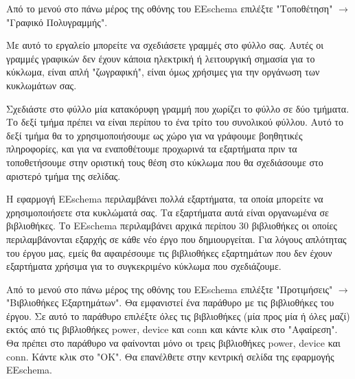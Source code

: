 \documentclass[a4paper]{article}
\begin{document}
\begin{figure}
  \begin{center}
    \label{fig:kicad-main}
  \end{center}
\end{figure}

Από το μενού στο πάνω μέρος της οθόνης του \textenglish{EEschema} επιλέξτε "Τοποθέτηση" $\rightarrow$ "Γραφικό Πολυγραμμής".

Με αυτό το εργαλείο μπορείτε να σχεδιάσετε γραμμές στο φύλλο σας. Αυτές οι γραμμές γραφικών δεν έχουν κάποια ηλεκτρική ή λειτουργική σημασία για το κύκλωμα, είναι απλή "ζωγραφική", είναι όμως χρήσιμες για την οργάνωση των κυκλωμάτων σας.

Σχεδιάστε στο φύλλο μία κατακόρυφη γραμμή που χωρίζει το φύλλο σε δύο τμήματα. Το δεξί τμήμα πρέπει να είναι περίπου το ένα τρίτο του συνολικού φύλλου. Αυτό το δεξί τμήμα θα το χρησιμοποιήσουμε ως χώρο για να γράφουμε  βοηθητικές πληροφορίες, και για να εναποθέτουμε προχωρινά τα εξαρτήματα πριν τα τοποθετήσουμε στην οριστική τους θέση στο κύκλωμα που θα σχεδιάσουμε στο αριστερό τμήμα της σελίδας.

\begin{figure}
  \begin{center}
    \label{fig:kicad-main}
  \end{center}
\end{figure}

Η εφαρμογή \textenglish{EEschema} περιλαμβάνει πολλά εξαρτήματα, τα οποία μπορείτε να χρησιμοποιήσετε στα κυκλώματά σας. Τα εξαρτήματα αυτά είναι οργανωμένα σε βιβλιοθήκες. Το \textenglish{EEschema} περιλαμβάνει αρχικά περίπου 30 βιβλιοθήκες οι οποίες περιλαμβάνονται εξαρχής σε κάθε νέο έργο που δημιουργείται. Για λόγους απλότητας του έργου μας, εμείς θα αφαιρέσουμε τις βιβλιοθήκες εξαρτημάτων που δεν έχουν εξαρτήματα χρήσιμα για το συγκεκριμένο κύκλωμα που σχεδιάζουμε.

Από το μενού στο πάνω μέρος της οθόνης του \textenglish{EEschema} επιλέξτε "Προτιμήσεις" $\rightarrow$ "Βιβλιοθήκες Εξαρτημάτων". Θα εμφανιστεί ένα παράθυρο με τις βιβλιοθήκες του έργου. Σε αυτό το παράθυρο επιλέξτε όλες τις βιβλιοθήκες (μία προς μία ή όλες μαζί) εκτός από τις βιβλιοθήκες power, device και conn και κάντε κλικ στο "Αφαίρεση". Θα πρέπει στο παράθυρο να φαίνονται μόνο οι τρεις βιβλιοθήκες power, device και conn. Κάντε κλικ στο "ΟΚ". Θα επανέλθετε στην κεντρική σελίδα της εφαρμογής \textenglish{EEschema}.
\end{document}
